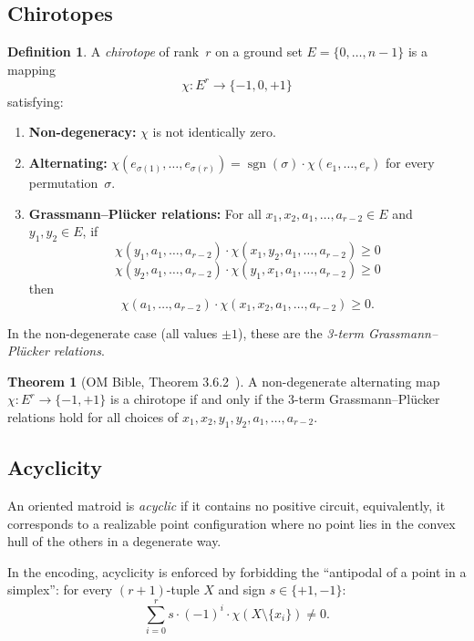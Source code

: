 \documentclass[11pt]{article}
\newcommand{\sgn}{\operatorname{sgn}}
\theoremstyle{definition}
\newtheorem{definition}{Definition}
\newtheorem{theorem}{Theorem}
\begin{document}
\subsection{Chirotopes}

\begin{definition}
A \emph{chirotope} of rank~$r$ on a ground set $E = \{0,\ldots,n-1\}$ is a mapping
\[
  \chi : E^r \to \{-1, 0, +1\}
\]
satisfying:
\begin{enumerate}
\item \textbf{Non-degeneracy:} $\chi$ is not identically zero.
\item \textbf{Alternating:} $\chi(e_{\sigma(1)}, \ldots, e_{\sigma(r)}) = \sgn(\sigma) \cdot \chi(e_1, \ldots, e_r)$ for every permutation~$\sigma$.
\item \textbf{Grassmann--Pl\"ucker relations:} For all $x_1, x_2, a_1, \ldots, a_{r-2} \in E$ and $y_1, y_2 \in E$, if
\[
  \chi(y_1, a_1, \ldots, a_{r-2}) \cdot \chi(x_1, y_2, a_1, \ldots, a_{r-2}) \geq 0
\]
\[
  \chi(y_2, a_1, \ldots, a_{r-2}) \cdot \chi(y_1, x_1, a_1, \ldots, a_{r-2}) \geq 0
\]
then
\[
  \chi(a_1, \ldots, a_{r-2}) \cdot \chi(x_1, x_2, a_1, \ldots, a_{r-2}) \geq 0.
\]
\end{enumerate}
\end{definition}

In the non-degenerate case (all values $\pm 1$), these are the \emph{3-term Grassmann--Pl\"ucker relations}.

\begin{theorem}[OM Bible, Theorem 3.6.2~\cite{BLSWZ1999}]
A non-degenerate alternating map $\chi : E^r \to \{-1, +1\}$ is a chirotope if and only if the 3-term Grassmann--Pl\"ucker relations hold for all choices of $x_1, x_2, y_1, y_2, a_1, \ldots, a_{r-2}$.
\end{theorem}

\subsection{Acyclicity}

An oriented matroid is \emph{acyclic} if it contains no positive circuit, equivalently, it corresponds to a realizable point configuration where no point lies in the convex hull of the others in a degenerate way.

In the encoding, acyclicity is enforced by forbidding the ``antipodal of a point in a simplex'': for every $(r{+}1)$-tuple $X$ and sign $s \in \{+1,-1\}$:
\[
  \sum_{i=0}^{r} s \cdot (-1)^i \cdot \chi(X \setminus \{x_i\}) \neq 0.
\]
\end{document}
